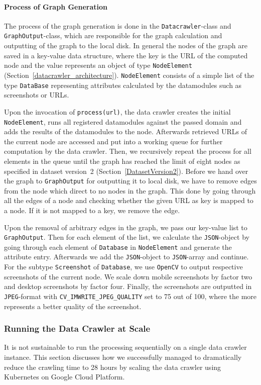 \paragraph*{Process of Graph Generation} 
The process of the graph generation is done in the \texttt{Datacrawler}-class and \texttt{GraphOutput}-class, which are responsible for the graph calculation and outputting of the graph to the local disk. In general the nodes of the graph are saved in a key-value data structure, where the key is the URL of the computed node and the value represents an object of type \texttt{NodeElement} (Section~\ref{datacrawler_architecture}). \texttt{NodeElement} consists of a simple list of the type \texttt{DataBase} representing attributes calculated by the datamodules such as screenshots or URLs.

Upon the invocation of \texttt{process(url)}, the data crawler creates the initial \texttt{NodeElement}, runs all registered datamodules against the passed domain and adds the results of the datamodules to the node. Afterwards retrieved URLs of the current node are accessed and put into a working queue for further computation by the data crawler. Then, we recursively repeat the process for all elements in the queue until the graph has reached the limit of eight nodes as specified in dataset version~2 (Section~\ref{DatasetVersion2}). Before we hand over the graph to \texttt{GraphOutput} for outputting it to local disk, we have to remove edges from the node which direct to no nodes in the graph. This done by going through all the edges of a node and checking whether the given URL as key is mapped to a node. If it is not mapped to a key, we remove the edge.

Upon the removal of arbitrary edges in the graph, we pass our key-value list to \texttt{GraphOutput}. Then for each element of the list, we calculate the \texttt{JSON}-object by going through each element of \texttt{Database} in \texttt{NodeElement} and generate the attribute entry. Afterwards we add the \texttt{JSON}-object to \texttt{JSON}-array and continue. For the subtype \texttt{Screenshot} of \texttt{Database}, we use \texttt{OpenCV} to output respective screenshots of the current node. We scale down mobile screenshots by factor two and desktop screenshots by factor four. Finally, the screenshots are outputted in \texttt{JPEG}-format with \texttt{CV\_IMWRITE\_JPEG\_QUALITY} set to 75 out of 100, where the more represents a better quality of the screenshot. 

\subsubsection{Running the Data Crawler at Scale}
\label{datacrawler_scale}
It is not sustainable to run the processing sequentially on a single data crawler instance. This section discusses how we successfully managed to dramatically reduce the crawling time to 28 hours by scaling the data crawler using Kubernetes on Google Cloud Platform. 

